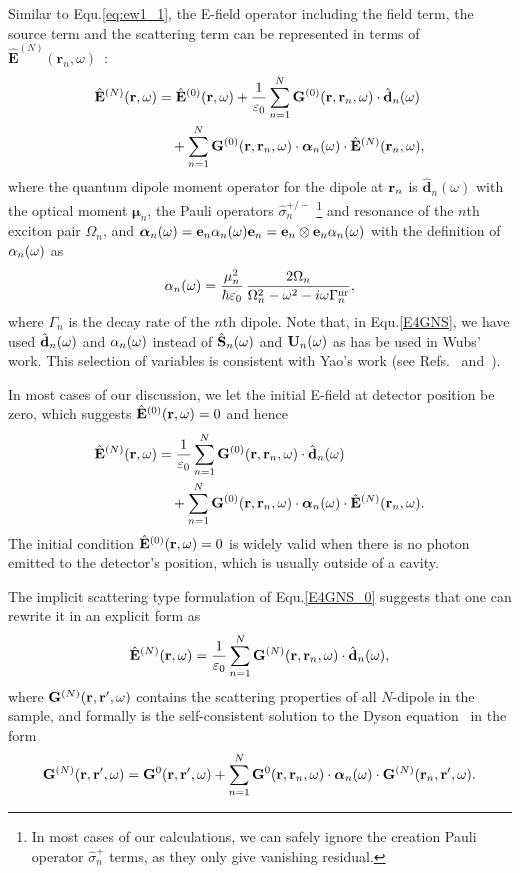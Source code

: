 Similar to Equ.\eqref{eq:ew1_1}, the E-field operator including the field term, the source term and the scattering term can be represented in terms of $\hat{\mathbf{E}}^{(N)}(\mathbf{r}_n,\omega)$~\cite{Wubs2004,Kristensen2011}:
\begin{align}
 \Erw &=\E0+\frac{1}{\varepsilon_0}\sum_{n=1}^N{\mathbf{G}^{(0)}(\rrn,\omega)\cdot \dnw} \nonumber \\
 &\quad +\sum_{n=1}^N{\mathbf{G}^{(0)}(\rrn,\omega)\cdot \Alphanw \cdot \hat{\mathbf{E}}^{(N)}(\mathbf{r}_n,\omega)}, \label{E4GNS}
\end{align}
where the quantum dipole moment operator for the dipole at $\mathbf{r}_n$ is $\mathbf{\hat{d}}_n(\omega)$
with the optical moment $\boldsymbol{\mu}_n$, the Pauli operators $\hat{\sigma}^{+/-}_n$ \footnote{In most cases of our calculations, we can safely ignore the creation Pauli operator $\hat{\sigma}^{+}_n$ terms, as they only give vanishing residual\cite{Kristensen}.} and resonance of the $n$th exciton pair $\Omega_n$,
and ${\bm \alpha}_n(\omega) = {\bf e}_n \alpha_n(\omega){\bf e}_n={\bf e}_n \otimes {\bf e}_n \alpha_n(\omega)$ with the definition of $\alpha_n(\omega)$ as
\begin{equation}
\label{alphanw}
\alpha_n(\omega)=\frac{\mu_n^2}{\hbar\varepsilon_0}\,\frac{2\Omega_n}{\Omega_n^2-\omega^2-i\omega\Gamma^{\rm
nr}_n},
\end{equation}
where $\Gamma_n$ is the decay rate of the $n$th dipole. Note that, in Equ.\eqref{E4GNS}, we have used $\hat{\mathbf{d}}_n(\omega)$ and $\alpha_n(\omega)$ instead of $\hat{\mathbf{S}}_n(\omega)$ and $\mathbf{U}_n(\omega)$ as has be used in Wubs' work. This selection of variables is consistent with Yao's work (see Refs.~\cite{Yao2009a,Yao2009b} and~\cite{Yao2009c}).

In most cases of our discussion, we let the initial E-field at detector position be zero, which suggests $\E0=0$ and hence
\begin{align}
 \label{E4GNS_0}
 \hat{\mathbf{E}}^{(N)}(\mathbf{r},\omega) &=\frac{1}{\varepsilon_0}\sum_{n=1}^N{\mathbf{G}^{(0)}(\mathbf{r},\mathbf{r}_n,\omega)\cdot \hat{\mathbf{d}}_n(\omega)} \\
 &\quad +\sum_{n=1}^N{\mathbf{G}^{(0)}(\mathbf{r},\mathbf{r}_n,\omega)\cdot {\bm \alpha}_n(\omega) \cdot \hat{\mathbf{E}}^{(N)}(\mathbf{r}_n,\omega)}.
\end{align}
The initial condition $\E0=0$ is widely valid when there is no photon emitted to the detector's position, which is usually outside of a cavity.

The implicit scattering type formulation of Equ.\eqref{E4GNS_0} suggests that one can rewrite it in an explicit form as
\begin{equation}
 \label{E4GNS_1}
\hat{\mathbf{E}}^{(N)}(\mathbf{r},\omega) =\frac{1}{\varepsilon_0}\sum_{n=1}^N{\mathbf{G}^{(N)}(\mathbf{r},\mathbf{r}_n,\omega)\cdot \hat{\mathbf{d}}_n(\omega)},
\end{equation}
where $\mathbf{G}^{(N)}(\mathbf{r},\mathbf{r}',\omega)$ contains the scattering properties
of all $N$-dipole in the sample, and formally is the self-consistent solution to the Dyson equation~\cite{Martin1998} in the form
\begin{equation}
 \label{dysonGN}
\mathbf{G}^{(N)}(\mathbf{r},\mathbf{r}',\omega)=\mathbf{G}^0(\mathbf{r},\mathbf{r}',\omega)+\sum_{n=1}^N{\mathbf{G}^0(\mathbf{r},\mathbf{r}_n,\omega)\cdot {\bm \alpha}_n(\omega) \cdot \mathbf{G}^{(N)}(\mathbf{r}_n,\mathbf{r}',\omega)}.
\end{equation}

